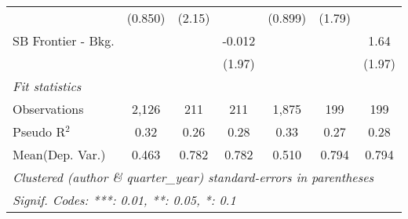 \begin{tabular}{lcccccc}
                        & (0.850) & (2.15) &              & (0.899) & (1.79) &   \\   
   SB Frontier - Bkg.   &         &        & -0.012       &         &        & 1.64\\   
                        &         &        & (1.97)       &         &        & (1.97)\\   
   \midrule
   \emph{Fit statistics}\\
   Observations         & 2,126   & 211    & 211          & 1,875   & 199    & 199\\  
   Pseudo R$^2$         & 0.32    & 0.26   & 0.28         & 0.33    & 0.27   & 0.28\\  
Mean(Dep. Var.) & 0.463 & 0.782 & 0.782 & 0.510 & 0.794 & 0.794 \\
   \midrule \midrule
   \multicolumn{7}{l}{\emph{Clustered (author \& quarter\_year) standard-errors in parentheses}}\\
   \multicolumn{7}{l}{\emph{Signif. Codes: ***: 0.01, **: 0.05, *: 0.1}}\\
\end{tabular}
\par\endgroup

